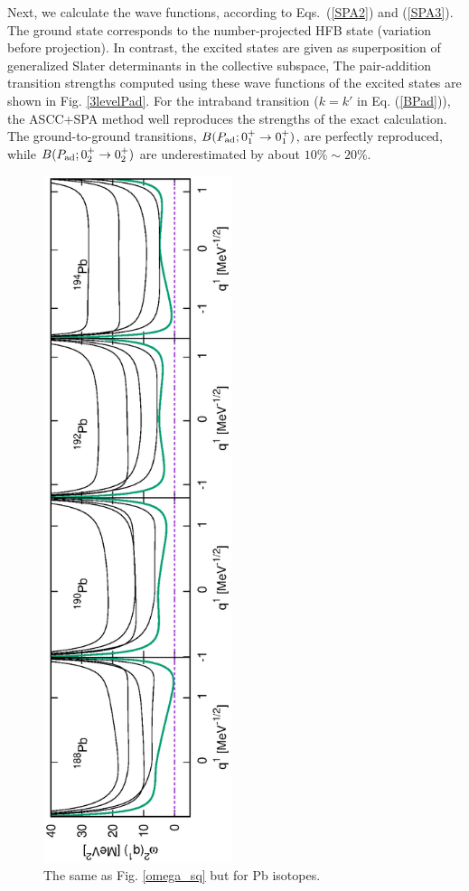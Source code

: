 \documentclass[%
superscriptaddress,
showpacs,
nofootinbib,
amsmath,amssymb,
aps,
prc,
twocolumn,
floatfix ]%
{revtex4-1}
\begin{document}
Next, we calculate the wave functions,
according to Eqs.~(\ref{SPA2}) and (\ref{SPA3}).
The ground state corresponds to the number-projected HFB state
(variation before projection).
In contrast, the excited states are given as superposition of
generalized Slater determinants in the collective subspace,
The pair-addition transition strengths
computed using these wave functions of the excited states
are shown in Fig. \ref{3levelPad}.
For the intraband transition ($k=k'$ in Eq. (\ref{BPad})),
the ASCC+SPA method well reproduces the strengths of the exact calculation.
The ground-to-ground transitions, $B(P_{\rm ad};0_1^+\rightarrow 0_1^+)$, 
are perfectly reproduced, while
$B(P_{\rm ad};0_2^+\rightarrow 0_2^+)$ are underestimated 
by about $10\%\sim20\%$.
\begin{figure}[tb]
 \begin{center}
  \includegraphics[width=55mm,angle=-90]{Pbomega_sq.eps}
 \end{center}
	\caption{The same as Fig. \ref{omega_sq} but for Pb isotopes.
}
 \label{Pb_omega_sq}
\end{figure}
\end{document}
